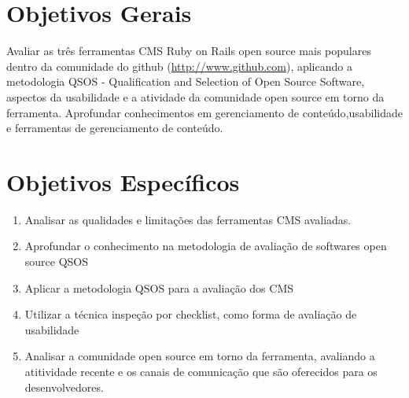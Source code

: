 \section{Objetivos Gerais}

Avaliar as três ferramentas CMS Ruby on Rails open source mais populares dentro da comunidade do github (\url{http://www.github.com}), aplicando a metodologia QSOS - Qualification and Selection of Open Source Software,  aspectos da usabilidade e a atividade da comunidade open source em torno da ferramenta. Aprofundar conhecimentos em gerenciamento de conteúdo,usabilidade e ferramentas de gerenciamento de conteúdo.

\section{Objetivos Específicos}

\begin{enumerate}

\item Analisar as qualidades e limitações das ferramentas CMS avaliadas.
\item Aprofundar o conhecimento na metodologia de avaliação de softwares open source QSOS
\item Aplicar a metodologia QSOS para a avaliação dos CMS
\item Utilizar a técnica inspeção por checklist, como forma de avaliação de usabilidade
\item Analisar a comunidade open source em torno da ferramenta, avaliando a atitividade recente e os canais de comunicação que são oferecidos para os desenvolvedores.

\end{enumerate}
